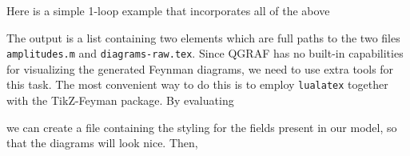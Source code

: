 \documentclass[../FeynHelpersManual.tex]{subfiles}
\begin{document}
Here is a simple 1-loop example that incorporates all of the above

\begin{Shaded}
\begin{Highlighting}[]
\ExtensionTok{=}\OperatorTok{[}\OperatorTok{,\{}\OperatorTok{,}\OperatorTok{\}}\OtherTok{{-}\textgreater{}}\OperatorTok{\{}\OperatorTok{,}\OperatorTok{\},}\OtherTok{{-}\textgreater{}}\OperatorTok{,}
\OtherTok{{-}\textgreater{}}\OperatorTok{,}\OtherTok{{-}\textgreater{}}\OperatorTok{\{}\OperatorTok{,}\OperatorTok{\},}
\OtherTok{{-}\textgreater{}}\OperatorTok{[\{}\OperatorTok{,}\OperatorTok{,}\OperatorTok{\}]]}\NormalTok{;}
\end{Highlighting}
\end{Shaded}

The output is a list containing two elements which are full paths to the
two files \texttt{amplitudes.m} and \texttt{diagrams-raw.tex}. Since
QGRAF has no built-in capabilities for visualizing the generated Feynman
diagrams, we need to use extra tools for this task. The most convenient
way to do this is to employ \texttt{lualatex} together with the
TikZ-Feyman package. By evaluating

\begin{Shaded}
\begin{Highlighting}[]
\ExtensionTok{=}\OperatorTok{[}\OperatorTok{,}\OperatorTok{,}
\OtherTok{{-}\textgreater{}}\OperatorTok{\{\{}\OperatorTok{,}\OperatorTok{,}\SpecialCharTok{\textbackslash{}\textbackslash{}}\OperatorTok{\},}
\OperatorTok{\{}\OperatorTok{,}\OperatorTok{,}\OperatorTok{\},}
\OperatorTok{\{}\OperatorTok{,}\OperatorTok{,}\OperatorTok{\}\}]}\NormalTok{;}
\end{Highlighting}
\end{Shaded}

we can create a file containing the styling for the fields present in
our model, so that the diagrams will look nice. Then,
\end{document}

